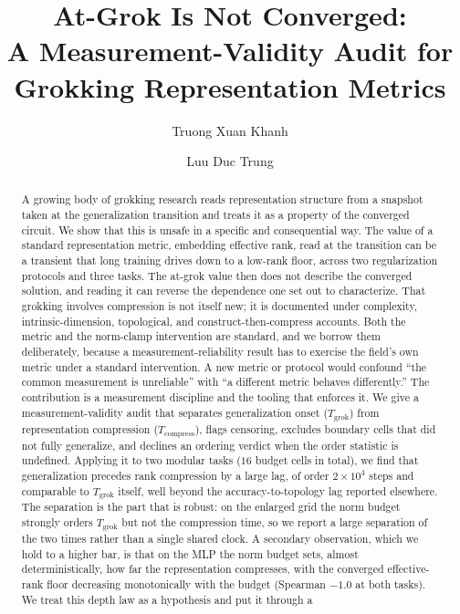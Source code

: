 \documentclass[11pt]{article}
\title{\textbf{At-Grok Is Not Converged:\\ A Measurement-Validity Audit for Grokking Representation Metrics}}
\author[1]{Truong Xuan Khanh}
\author[1]{Luu Duc Trung}
\affil[1]{H\&K Research Studio / Clevix LLC, Hanoi, Vietnam}
\affil[ ]{\texttt{khanh@clevix.vn}}
\date{}
\begin{document}
\setlength{\emergencystretch}{2em}
\maketitle

\begin{abstract}
A growing body of grokking research reads representation structure from a snapshot taken at the
generalization transition and treats it as a property of the converged circuit. We show that this is
unsafe in a specific and consequential way. The value of a standard representation metric, embedding
effective rank, read at the transition can be a transient that long training drives down to a low-rank
floor, across two regularization protocols and three tasks. The at-grok value then does not describe the
converged solution, and reading it can reverse the dependence one set out to characterize. That grokking
involves compression is not itself new; it is documented under complexity, intrinsic-dimension,
topological, and construct-then-compress accounts. Both the metric and the norm-clamp intervention are
standard, and we borrow them deliberately, because a measurement-reliability result has to exercise the
field's own metric under a standard intervention. A new metric or protocol would confound ``the common
measurement is unreliable'' with ``a different metric behaves differently.'' The contribution is a
measurement discipline and the tooling that enforces it. We give a measurement-validity audit that
separates generalization onset ($T_{\mathrm{grok}}$) from representation compression
($T_{\mathrm{compress}}$), flags censoring, excludes boundary cells that did not fully generalize, and
declines an ordering verdict when the order statistic is undefined. Applying it to two modular tasks
($16$ budget cells in total), we find that generalization precedes rank compression by a large lag, of
order $2\times10^4$ steps and comparable to $T_{\mathrm{grok}}$ itself, well beyond the
accuracy-to-topology lag reported elsewhere. The separation is the part that is robust: on the enlarged
grid the norm budget strongly orders $T_{\mathrm{grok}}$ but not the compression time, so we report a
large separation of the two times rather than a single shared clock. A secondary observation, which we
hold to a higher bar, is that on the MLP the norm budget sets, almost deterministically, how far the
representation compresses, with the converged effective-rank floor decreasing monotonically with the
budget (Spearman $-1.0$ at both tasks). We treat this depth law as a hypothesis and put it through a

\end{abstract}
\end{document}
